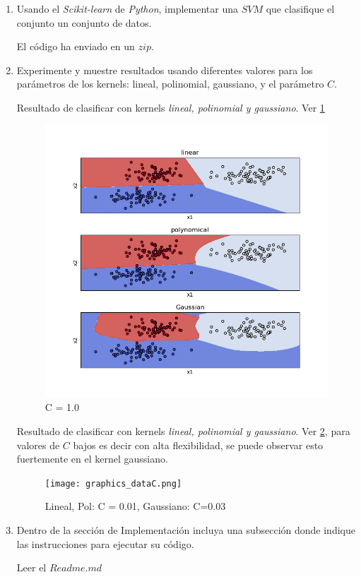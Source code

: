 \documentclass{article}
\begin{document}
\begin{enumerate}
    \item Usando el \textit{Scikit-learn} de \textit{Python}, implementar una $SVM$ que clasifique el conjunto un conjunto de datos.

    El código ha enviado en un $zip$.

    \item Experimente y muestre resultados usando diferentes valores para los parámetros de los kernels: lineal,
    polinomial, gaussiano, y el parámetro $C$.

    Resultado de clasificar con kernels \textit{lineal, polinomial y gaussiano}. Ver \ref{PLOT_P1_3}
    \begin{figure}[h]
        \label{PLOT_P1_3}
        \centering
        \includegraphics[width=.6\textwidth]{graphics_data1.png}
        \caption{C = 1.0}
    \end{figure}
     
    Resultado de clasificar con kernels \textit{lineal, polinomial y gaussiano}. Ver \ref{PLOT4}, para valores de $C$ bajos
    es decir con alta flexibilidad, se puede observar esto fuertemente en el kernel gaussiano.
    \begin{figure}[h]
        \label{PLOT4}
        \centering
        \texttt{[image: graphics\_dataC.png]}
        \caption{Lineal, Pol: C = 0.01, Gaussiano: C=0.03}
    \end{figure}

    \item Dentro de la sección de Implementación incluya una subsección donde indique las instrucciones
    para ejecutar su código.

    Leer el $Readme.md$

\end{enumerate}
\end{document}
